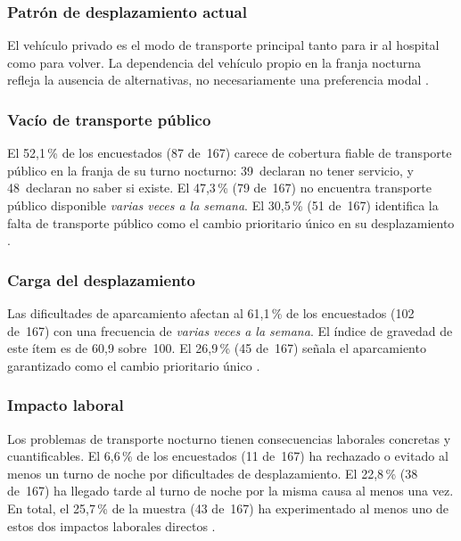 \subsubsection{Patrón de desplazamiento actual}
\label{sec:patron-desplazamiento}

El vehículo privado es el modo de transporte principal tanto para ir al hospital como para volver. La dependencia del vehículo propio en la franja nocturna refleja la ausencia de alternativas, no necesariamente una preferencia modal \parencite{LouridoRegueira2026}.

\subsubsection{Vacío de transporte público}
\label{sec:vacio-tp}

El 52{,}1\,\% de los encuestados (87 de~167) carece de cobertura fiable de transporte público en la franja de su turno nocturno: 39~declaran no tener servicio, y 48~declaran no saber si existe. El 47{,}3\,\% (79 de~167) no encuentra transporte público disponible \emph{varias veces a la semana}. El 30{,}5\,\% (51 de~167) identifica la falta de transporte público como el cambio prioritario único en su desplazamiento \parencite{LouridoRegueira2026}.

\subsubsection{Carga del desplazamiento}
\label{sec:carga-desplazamiento}

Las dificultades de aparcamiento afectan al 61{,}1\,\% de los encuestados (102 de~167) con una frecuencia de \emph{varias veces a la semana}. El índice de gravedad de este ítem es de 60{,}9 sobre~100. El 26{,}9\,\% (45 de~167) señala el aparcamiento garantizado como el cambio prioritario único \parencite{LouridoRegueira2026}.

\subsubsection{Impacto laboral}
\label{sec:impacto-laboral}

Los problemas de transporte nocturno tienen consecuencias laborales concretas y cuantificables. El 6{,}6\,\% de los encuestados (11 de~167) ha rechazado o evitado al menos un turno de noche por dificultades de desplazamiento. El 22{,}8\,\% (38 de~167) ha llegado tarde al turno de noche por la misma causa al menos una vez. En total, el 25{,}7\,\% de la muestra (43 de~167) ha experimentado al menos uno de estos dos impactos laborales directos \parencite{LouridoRegueira2026}.

